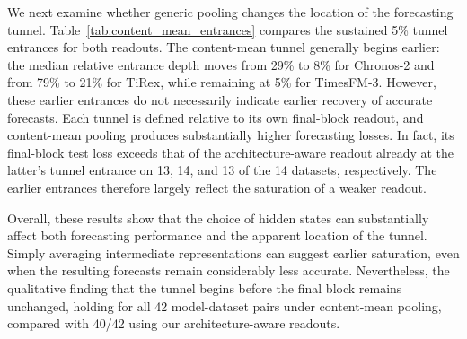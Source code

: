 We next examine whether generic pooling changes the location of the forecasting tunnel. Table~\ref{tab:content_mean_entrances} compares the sustained 5\% tunnel entrances for both readouts. The content-mean tunnel generally begins earlier: the median relative entrance depth moves from 29\% to 8\% for Chronos-2 and from 79\% to 21\% for TiRex, while remaining at 5\% for TimesFM-3. However, these earlier entrances do not necessarily indicate earlier recovery of accurate forecasts. Each tunnel is defined relative to its own final-block readout, and content-mean pooling produces substantially higher forecasting losses. In fact, its final-block test loss exceeds that of the architecture-aware readout already at the latter's tunnel entrance on 13, 14, and 13 of the 14 datasets, respectively. The earlier entrances therefore largely reflect the saturation of a weaker readout.

Overall, these results show that the choice of hidden states can substantially affect both forecasting performance and the apparent location of the tunnel. Simply averaging intermediate representations can suggest earlier saturation, even when the resulting forecasts remain considerably less accurate. Nevertheless, the qualitative finding that the tunnel begins before the final block remains unchanged, holding for all 42 model-dataset pairs under content-mean pooling, compared with 40/42 using our architecture-aware readouts.


